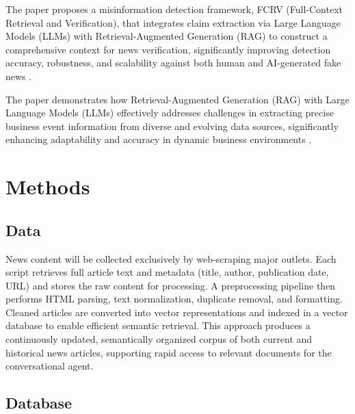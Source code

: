 \documentclass[fleqn,moreauthors,10pt]{ds_report}
\begin{document}
    The paper proposes a misinformation detection framework, FCRV (Full-Context Retrieval and Verification), that integrates claim extraction via Large Language Models (LLMs) with Retrieval-Augmented Generation (RAG) to construct a comprehensive context for news verification, significantly improving detection accuracy, robustness, and scalability against both human and AI-generated fake news \cite{10826000}.

    The paper demonstrates how Retrieval-Augmented Generation (RAG) with Large Language Models (LLMs) effectively addresses challenges in extracting precise business event information from diverse and evolving data sources, significantly enhancing adaptability and accuracy in dynamic business environments \cite{ARSLAN20244534}.



\section*{Methods}



\subsection*{Data}

News content will be collected exclusively by web‑scraping major outlets. Each script retrieves full article text and metadata (title, author, publication date, URL) and stores the raw content for processing. A preprocessing pipeline then performs HTML parsing, text normalization, duplicate removal, and formatting. Cleaned articles are converted into vector representations and indexed in a vector database to enable efficient semantic retrieval. This approach produces a continuously updated, semantically organized corpus of both current and historical news articles, supporting rapid access to relevant documents for the conversational agent.

\subsection{Database}
\end{document}
